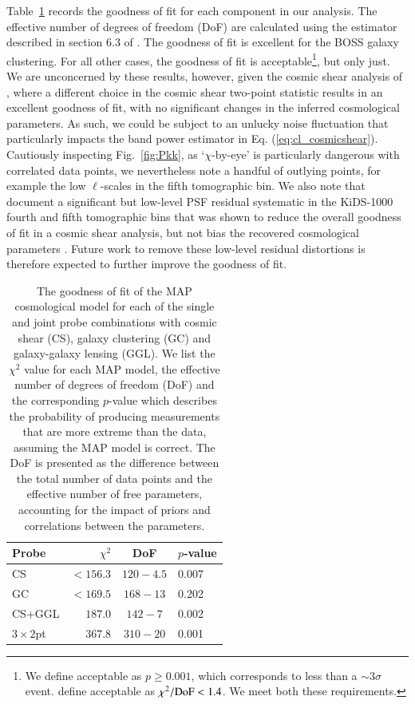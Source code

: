 Table~\ref{tab:goodness-of-fit} records the goodness of fit for each component in our \tttp analysis.  The effective number of degrees of freedom (DoF) are calculated using the estimator described in section 6.3 of \citet{joachimi/etal:inprep}.  
The goodness of fit is excellent for the BOSS galaxy clustering.  For all other cases, the goodness of fit is acceptable\footnote{We define acceptable as $p \geq 0.001$, which corresponds to less than a $\sim 3\sigma$ event.   \citet{abbott/etal:2018} define acceptable as $\chi^2/{\rm DoF} < 1.4$.  We meet both these requirements.}, but only just.
We are unconcerned by these results, however, given the cosmic shear analysis of \citet{asgari/etal:inprep}, where a different choice in the cosmic shear two-point statistic results in an excellent goodness of fit, with no significant changes in the inferred cosmological parameters.    As such, we could be subject to an unlucky noise fluctuation that particularly impacts the band power estimator in Eq. (\ref{eq:cl_cosmicshear}).  Cautiously inspecting Fig.~\ref{fig:Pkk}, as `$\chi$-by-eye' is particularly dangerous with correlated data points, we nevertheless note a handful of outlying points, for example the low $\ell$-scales in the fifth tomographic bin.   We also note that \citet{giblin/etal:inprep} document a significant but low-level PSF residual systematic in the KiDS-1000 fourth and fifth tomographic bins that was shown to reduce the overall goodness of fit in a cosmic shear analysis, but not bias the recovered cosmological parameters \citep[see also the discussion in][]{amara/refregier:2008}.  Future work to remove these low-level residual distortions is therefore expected to further improve the goodness of fit.

\begin{table}
	\begin{center}
		\caption{The goodness of fit of the MAP cosmological model for each of the single and joint probe combinations with cosmic shear (CS), galaxy clustering (GC) and galaxy-galaxy lensing (GGL).   We list the $\chi^2$ value for each MAP model, the effective number of degrees of freedom (DoF) and the corresponding $p$-value which describes the probability of producing measurements that are more extreme than the data, assuming the MAP model is correct.   The DoF is presented as the difference between the total number of data points and the effective number of free parameters, accounting for the impact of priors and correlations between the parameters.}
		\label{tab:goodness-of-fit}
\begin{tabular}{lrcl}
    \toprule
    Probe             & $\chi^2$       & DoF       & $p$-value   \\
    \midrule
	CS               & $< 156.3$ & $120-4.5$ & 0.007 \\
	GC               & $< 169.5$ & $168-13$ & 0.202 \\
	CS+GGL           & $187.0$ & $142-7$ & 0.002 \\
	$3\times2$pt            & $367.8$ & $310-20$ & 0.001 \\

    \bottomrule
\end{tabular}
	\end{center}
\end{table}

